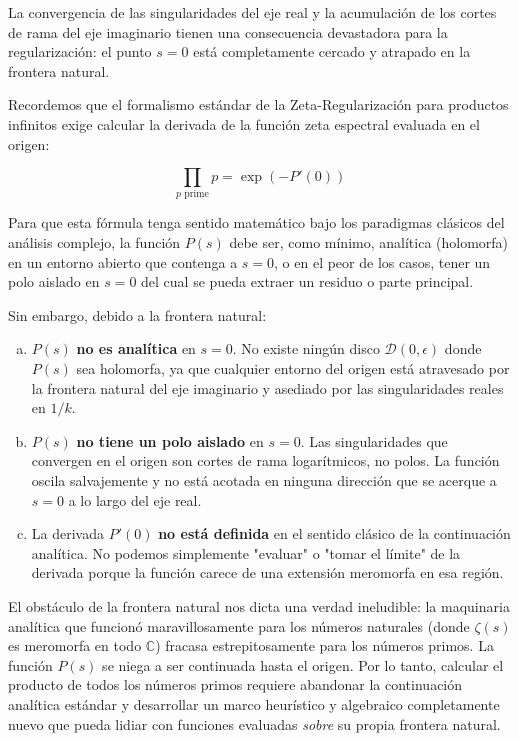 La convergencia de las singularidades del eje real y la acumulación de los cortes de rama del eje imaginario tienen una consecuencia devastadora para la regularización: el punto $s=0$ está completamente cercado y atrapado en la frontera natural.

Recordemos que el formalismo estándar de la Zeta-Regularización para productos infinitos exige calcular la derivada de la función zeta espectral evaluada en el origen:

$$ \prod_{p \text{ prime}} p = \exp(-P'(0)) $$

Para que esta fórmula tenga sentido matemático bajo los paradigmas clásicos del análisis complejo, la función $P(s)$ debe ser, como mínimo, analítica (holomorfa) en un entorno abierto que contenga a $s=0$, o en el peor de los casos, tener un polo aislado en $s=0$ del cual se pueda extraer un residuo o parte principal. 

Sin embargo, debido a la frontera natural:
\begin{enumerate}[a)]
    \item $P(s)$ \textbf{no es analítica} en $s=0$. No existe ningún disco $\mathcal{D}(0, \epsilon)$ donde $P(s)$ sea holomorfa, ya que cualquier entorno del origen está atravesado por la frontera natural del eje imaginario y asediado por las singularidades reales en $1/k$.
    \item $P(s)$ \textbf{no tiene un polo aislado} en $s=0$. Las singularidades que convergen en el origen son cortes de rama logarítmicos, no polos. La función oscila salvajemente y no está acotada en ninguna dirección que se acerque a $s=0$ a lo largo del eje real.
    \item La derivada $P'(0)$ \textbf{no está definida} en el sentido clásico de la continuación analítica. No podemos simplemente "evaluar" o "tomar el límite" de la derivada porque la función carece de una extensión meromorfa en esa región.
\end{enumerate}

El obstáculo de la frontera natural nos dicta una verdad ineludible: la maquinaria analítica que funcionó maravillosamente para los números naturales (donde $\zeta(s)$ es meromorfa en todo $\mathbb{C}$) fracasa estrepitosamente para los números primos. La función $P(s)$ se niega a ser continuada hasta el origen. Por lo tanto, calcular el producto de todos los números primos requiere abandonar la continuación analítica estándar y desarrollar un marco heurístico y algebraico completamente nuevo que pueda lidiar con funciones evaluadas \textit{sobre} su propia frontera natural.

